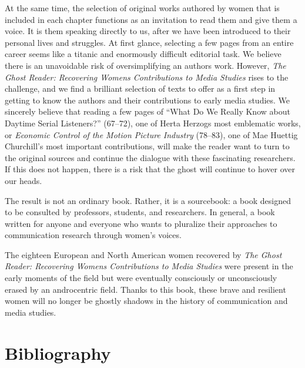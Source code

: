 \documentclass{tufte-handout}
\begin{document}
 \enlargethispage{\baselineskip}

At the same time, the selection of original works authored by women that
is included in each chapter functions as an invitation to read them and
give them a voice. It is them speaking directly to us, after we have
been introduced to their personal lives and struggles. At first glance,
selecting a few pages from an entire career seems like a titanic and
enormously difficult editorial task. We believe there is an unavoidable
risk of oversimplifying an author\textquotesingle s work. However,
\emph{The Ghost Reader: Recovering Women\textquotesingle s Contributions
to Media Studies} rises to the challenge, and we find a brilliant
selection of texts to offer as a first step in getting to know the
authors and their contributions to early media studies. We sincerely
believe that reading a few pages of ``What Do We Really Know about
Daytime Serial Listeners?'' (67--72), one of Herta
Herzog\textquotesingle s most emblematic works, or \emph{Economic
Control of the Motion Picture Industry} (78--83), one of Mae Huettig
Churchill's most important contributions, will make the reader want to
turn to the original sources and continue the dialogue with these
fascinating researchers. If this does not happen, there is a risk that
the ghost will continue to hover over our heads.

The result is not an ordinary book. Rather, it is a sourcebook: a book
designed to be consulted by professors, students, and researchers. In
general, a book written for anyone and everyone who wants to pluralize
their approaches to communication research through women's voices.

\newpage The eighteen European and North American women recovered by \emph{The
Ghost Reader: Recovering Women\textquotesingle s Contributions to Media
Studies} were present in the early moments of the field but were
eventually consciously or unconsciously erased by an androcentric field.
Thanks to this book, these brave and resilient women will no longer be
ghostly shadows in the history of communication and media studies.




\section{Bibliography}\label{bibliography}
\end{document}

